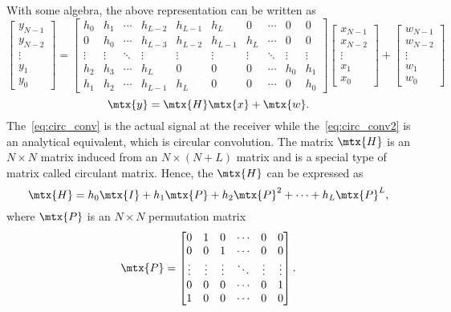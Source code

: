 With some algebra, the above representation can be written as
\begin{equation}
    \label{eq:circ_conv2}
    \begin{bmatrix}
        y_{N-1} \\ y_{N-2} \\ \vdots \\ y_1 \\ y_0
    \end{bmatrix}
    =
    \begin{bmatrix}
        h_0 & h_1 & \cdots & h_{L-2} & h_{L-1} & h_{L} & 0 & \cdots & 0 & 0 \\
        0 & h_0 & \cdots & h_{L-3} & h_{L-2} & h_{L-1} & h_{L} & \cdots & 0 & 0 \\
        \vdots & \vdots & \ddots & \vdots & \vdots & \vdots & \vdots & \ddots & \vdots & \vdots \\
        h_2 & h_3 & \cdots & h_{L} & 0 & 0 & 0 & \cdots & h_0 & h_1 \\
        h_1 & h_2 & \cdots & h_{L-1} & h_{L} & 0 & 0 & \cdots & 0 & h_0
    \end{bmatrix}
    \begin{bmatrix}
        x_{N-1} \\ x_{N-2} \\ \vdots \\ x_1 \\ x_0
    \end{bmatrix}
    +
    \begin{bmatrix}
        w_{N-1} \\ w_{N-2} \\ \vdots \\ w_1 \\ w_0
    \end{bmatrix}
\end{equation}
\begin{equation}
    \mtx{y} = \mtx{H}\mtx{x} + \mtx{w}.
\end{equation}
The~\cref{eq:circ_conv} is the actual signal at the receiver while the~\cref{eq:circ_conv2} is an analytical equivalent, which is circular convolution. The matrix $\mtx{H}$ is an $N\times N$ matrix induced from an $N\times(N+L)$ matrix and is a special type of matrix called circulant matrix. Hence, the $\mtx{H}$ can be expressed as
\begin{equation}
    \label{eq:circ_mat}
    \mtx{H} = h_0\mtx{I}+h_1\mtx{P}+h_2\mtx{P}^2+\cdots+h_L\mtx{P}^L,
\end{equation}
where $\mtx{P}$ is an $N\times N$ permutation matrix
\begin{equation}
    \mtx{P} = \begin{bmatrix}
        0 & 1 & 0 & \cdots & 0 & 0 \\
        0 & 0 & 1 & \cdots & 0 & 0 \\
        \vdots & \vdots & \vdots & \ddots & \vdots & \vdots \\
        0 & 0 & 0 & \cdots & 0 & 1 \\
        1 & 0 & 0 & \cdots & 0 & 0
    \end{bmatrix}.
\end{equation}

